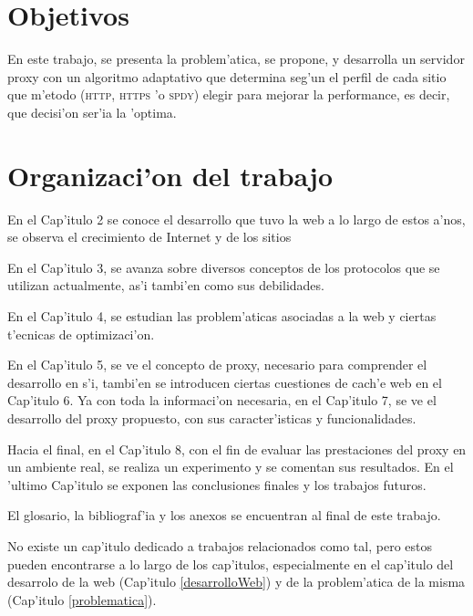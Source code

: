 \section{Objetivos}

En este trabajo, se presenta la problem'atica, se propone, y desarrolla un servidor proxy con un algoritmo adaptativo que determina seg'un el perfil de cada sitio que m'etodo (\textsc{http}, \textsc{https} 'o \textsc{spdy}) elegir para mejorar la performance, es decir, que decisi'on ser'ia la 'optima.

\section{Organizaci'on del trabajo}

En el Cap'itulo 2 se conoce el desarrollo que tuvo la web a lo largo de estos a'nos, se observa el crecimiento  de Internet y de los sitios

En el Cap'itulo 3, se avanza sobre diversos conceptos de los protocolos que se utilizan actualmente, as'i tambi'en como sus debilidades. 

En el Cap'itulo 4, se estudian las problem'aticas asociadas a la web y ciertas t'ecnicas de optimizaci'on. 

En el Cap'itulo 5, se ve el concepto de proxy, necesario para comprender el desarrollo en s'i, tambi'en se introducen ciertas cuestiones de cach'e web en el Cap'itulo 6. Ya con toda la informaci'on necesaria, en el Cap'itulo 7, se ve el desarrollo del proxy propuesto, con sus caracter'isticas y funcionalidades. 

Hacia el final, en el Cap'itulo 8, con el fin de evaluar las prestaciones del proxy en un ambiente real, se realiza un experimento y se comentan sus resultados. En el 'ultimo Cap'itulo se exponen las conclusiones finales y los trabajos futuros.

El glosario, la bibliograf'ia y los anexos se encuentran al final de este trabajo. 

No existe un cap'itulo dedicado a trabajos relacionados como tal, pero estos pueden encontrarse a lo largo de los cap'itulos, especialmente en el cap'itulo del desarrolo de la web (Cap'itulo \ref{desarrolloWeb}) y de la problem'atica de la misma (Cap'itulo \ref{problematica}). 